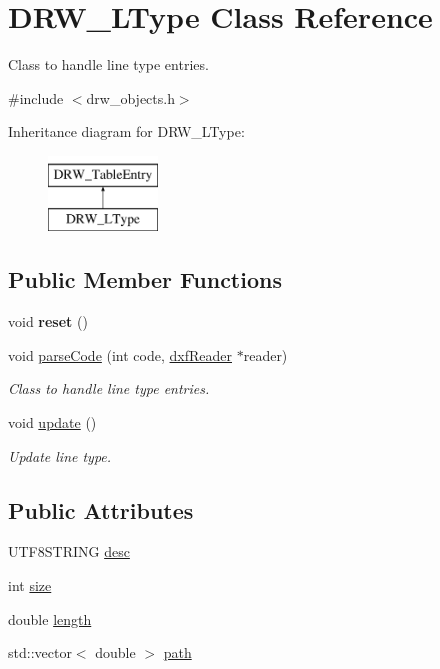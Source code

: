 \hypertarget{classDRW__LType}{\section{D\-R\-W\-\_\-\-L\-Type Class Reference}
\label{classDRW__LType}
}


Class to handle line type entries.  




{\ttfamily \#include $<$drw\-\_\-objects.\-h$>$}

Inheritance diagram for D\-R\-W\-\_\-\-L\-Type\-:\begin{figure}[H]
\begin{center}
\leavevmode
\includegraphics[height=2.000000cm]{classDRW__LType}
\end{center}
\end{figure}
\subsection*{Public Member Functions}
\begin{DoxyCompactItemize}
\item 
\hypertarget{classDRW__LType_a04278a37e58c3ee13a1a4392cc675d28}{void {\bfseries reset} ()}\label{classDRW__LType_a04278a37e58c3ee13a1a4392cc675d28}

\item 
void \hyperlink{classDRW__LType_a7c1bcdc02c5aa43262221ad55dfac6ff}{parse\-Code} (int code, \hyperlink{classdxfReader}{dxf\-Reader} $\ast$reader)
\begin{DoxyCompactList}\small\item\em Class to handle line type entries. \end{DoxyCompactList}\item 
void \hyperlink{classDRW__LType_a9cebdfa5d1ae14720c4fcd50f45dab5a}{update} ()
\begin{DoxyCompactList}\small\item\em Update line type. \end{DoxyCompactList}\end{DoxyCompactItemize}
\subsection*{Public Attributes}
\begin{DoxyCompactItemize}
\item 
U\-T\-F8\-S\-T\-R\-I\-N\-G \hyperlink{classDRW__LType_ae6f6458c8c9ac100908259558c7e22d2}{desc}
\item 
int \hyperlink{classDRW__LType_acb78cd0a105ac8b44e19313a4bf90f50}{size}
\item 
double \hyperlink{classDRW__LType_a438510524566f0deaf77ea694f171762}{length}
\item 
std\-::vector$<$ double $>$ \hyperlink{classDRW__LType_afb0702d3edab2948fdba2fb861fd3a4b}{path}
\end{DoxyCompactItemize}
